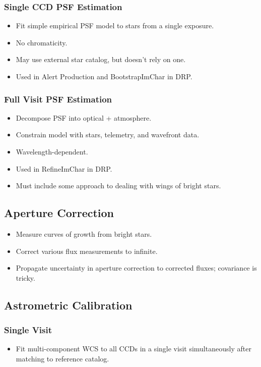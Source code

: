 \subsubsection{Single CCD PSF Estimation}
\begin{itemize}
\item Fit simple empirical PSF model to stars from a single exposure.
\item No chromaticity.
\item May use external star catalog, but doesn't rely on one.
\item Used in Alert Production and BootstrapImChar in DRP.
\end{itemize}
\subsubsection{Full Visit PSF Estimation}
\begin{itemize}
\item Decompose PSF into optical + atmosphere.
\item Constrain model with stars, telemetry, and wavefront data.
\item Wavelength-dependent.
\item Used in RefineImChar in DRP.
\item Must include some approach to dealing with wings of bright stars.
\end{itemize}

\subsection{Aperture Correction}
\begin{itemize}
\item Measure curves of growth from bright stars.
\item Correct various flux measurements to infinite.
\item Propagate uncertainty in aperture correction to corrected fluxes; covariance is tricky.
\end{itemize}

\subsection{Astrometric Calibration}
\subsubsection{Single Visit}
\begin{itemize}
\item Fit multi-component WCS to all CCDs in a single visit simultaneously after matching to reference catalog.
\end{itemize}
